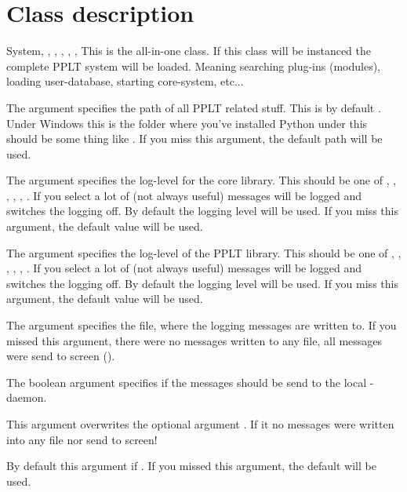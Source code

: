 \section{Class description}
\begin{classdesc}{System}{, , 
, , , 
, }
This is the all-in-one class. If this class will be instanced the complete 
PPLT system will be loaded. Meaning searching plug-ins (modules), loading 
user-database, starting core-system, etc...

The argument  specifies the path of all PPLT related stuff. This 
is by default . Under Windows this is the folder 
where you've installed Python under \UNIX this should be some thing like 
. If you miss this argument, the default path will be 
used.

The argument  specifies the log-level for the core library. 
This should be one of , , , , 
, .  If you select  a lot of (not always 
useful) messages will be logged and  switches the logging off. 
By default the logging level  will be used. If you miss this 
argument, the default value will be used.

The argument  specifies the log-level of the PPLT library. 
This should be one of , , , , 
, . If you select  a lot of (not always 
useful) messages will be logged and  switches the logging off. 
By default the logging level  will be used. If you miss this 
argument, the default value will be used.

The argument  specifies the file,  where the logging messages are
written to. If you missed this argument, there were no messages written to any
file, all messages were send to screen (). 

The boolean argument  specifies if the messages should be send to
the local -daemon. 
\begin{notice}
This argument overwrites the optional argument . If 
it  no messages were written into any file nor send to screen!
\end{notice}
By default this argument if . If you missed this argument, the 
default will be used.


\end{classdesc}
